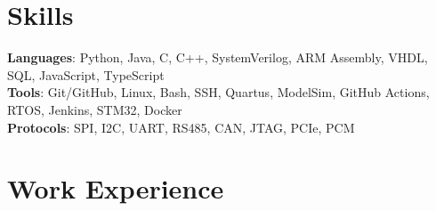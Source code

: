 \documentclass[letterpaper,11pt]{article}
\makeatletter
\newcommand{\resumeItem}[1]{
  \item\small{
    {#1 \vspace{-2pt}}
  }
}
\newcommand{\resumeSubheading}[4]{
  \vspace{-2pt}\item
    \begin{tabular*}{1.0\textwidth}[t]{l@{\extracolsep{\fill}}r}
      \textbf{#1} & \textbf{\small #2} \\
      \textit{\small#3} & \textit{\small #4} \\
    \end{tabular*}\vspace{-7pt}
}
\newcommand{\resumeSubHeadingListStart}{\begin{itemize}[leftmargin=0.0in, label={}]}
\newcommand{\resumeSubHeadingListEnd}{\end{itemize}}
\newcommand{\resumeItemListStart}{\begin{itemize}}
\newcommand{\resumeItemListEnd}{\end{itemize}\vspace{-5pt}}
\makeatother
\begin{document}
\section{Skills}
\begin{itemize}[leftmargin=0.15in, label={}]
    \small{\item{
     \textbf{Languages}{: Python, Java, C, C++, SystemVerilog, ARM Assembly, VHDL, SQL, JavaScript, TypeScript} \\
     \textbf{Tools}{: Git/GitHub, Linux, Bash, SSH, Quartus, ModelSim, GitHub Actions, RTOS, Jenkins, STM32, Docker} \\
     \textbf{Protocols}{: SPI, I2C, UART, RS485, CAN, JTAG, PCIe, PCM} \\
    }}
\end{itemize}



\vspace{-16pt}
\section{Work Experience}
%

\end{document}

